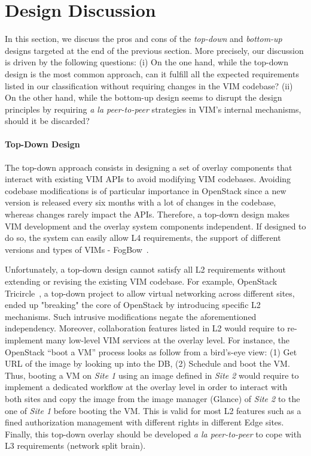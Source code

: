 
\section{Design Discussion}
\label{sec:design_discussion}

In this section, we discuss the pros and cons of the \emph{top-down} and
\emph{bottom-up} designs targeted at the end of the previous section.
More precisely, our discussion is driven by the following questions: (i) On the
one hand, while the top-down design is the most common approach, can it fulfill
all the expected requirements listed in our classification without requiring
changes in the VIM codebase? (ii) On the other hand, while the bottom-up design
seems to disrupt the design principles by requiring \emph{a la peer-to-peer}
strategies in VIM's internal mechanisms, should it be discarded?

\paragraph{Top-Down Design}
The top-down approach consists in designing a set of overlay components that
interact with existing VIM APIs to avoid modifying VIM codebases.
Avoiding codebase modifications is of particular importance in OpenStack since
a new version is released every six months with a lot of changes in the
codebase, whereas changes rarely impact the APIs. Therefore, a top-down design
makes VIM development and the overlay system components independent. If
designed to do so, the system can easily allow L4 requirements, \ie the
support of different versions and types of VIMs - \eg
FogBow~\cite{brasileiro2016fogbow}.

Unfortunately, a top-down design cannot satisfy all L2 requirements
without extending or revising the existing VIM codebase. For example,
OpenStack Tricircle~\cite{tricircle}, a top-down project to allow
virtual networking across different sites, ended up "breaking" the
core of OpenStack by introducing specific L2 mechanisms. Such
intrusive modifications negate the aforementioned independency.
%
Moreover, collaboration features listed in L2 would require to
re-implement many low-level VIM services at the overlay level. For
instance, the OpenStack ``boot a VM'' process looks as follow from a
bird's-eye view: (1) Get URL of the image by looking up into the
DB, (2) Schedule and boot the VM. Thus, booting a VM on
\emph{Site 1} using an image defined in \emph{Site 2} would require to
implement a dedicated workflow at the overlay level in order to
interact with both sites and copy the image from the image manager
(\ie Glance) of \emph{Site 2} to the one of \emph{Site 1} before booting the VM. 
%
This is valid for most L2 features such as a fined authorization management
with different rights in different Edge sites.
%
Finally, this top-down overlay should be developed \emph{a la
  peer-to-peer} to cope with L3 requirements (\ie network split brain).


